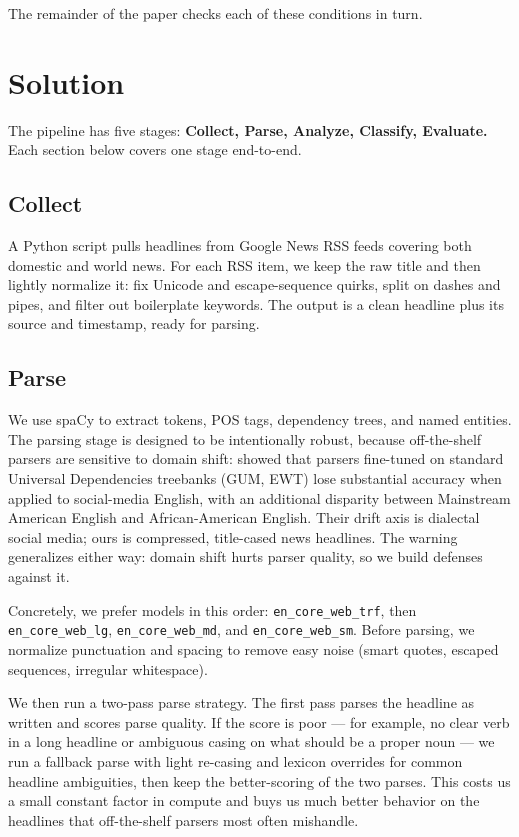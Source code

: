 \documentclass[11pt]{article}
\begin{document}
The remainder of the paper checks each of these conditions in turn.

\section{Solution}
The pipeline has five stages: \textbf{Collect, Parse, Analyze, Classify, Evaluate.} Each section below covers one stage end-to-end.

\subsection{Collect}
A Python script pulls headlines from Google News RSS feeds covering both domestic and world news. For each RSS item, we keep the raw title and then lightly normalize it: fix Unicode and escape-sequence quirks, split on dashes and pipes, and filter out boilerplate keywords. The output is a clean headline plus its source and timestamp, ready for parsing.

\subsection{Parse}
We use spaCy to extract tokens, POS tags, dependency trees, and named entities. The parsing stage is designed to be intentionally robust, because off-the-shelf parsers are sensitive to domain shift: \citet{eggleston-oconnor-2022-cross} showed that parsers fine-tuned on standard Universal Dependencies treebanks (GUM, EWT) lose substantial accuracy when applied to social-media English, with an additional disparity between Mainstream American English and African-American English. Their drift axis is dialectal social media; ours is compressed, title-cased news headlines. The warning generalizes either way: domain shift hurts parser quality, so we build defenses against it.

Concretely, we prefer models in this order: \texttt{en\_core\_web\_trf}, then \texttt{en\_core\_web\_lg}, \texttt{en\_core\_web\_md}, and \texttt{en\_core\_web\_sm}. Before parsing, we normalize punctuation and spacing to remove easy noise (smart quotes, escaped sequences, irregular whitespace).

We then run a two-pass parse strategy. The first pass parses the headline as written and scores parse quality. If the score is poor --- for example, no clear verb in a long headline or ambiguous casing on what should be a proper noun --- we run a fallback parse with light re-casing and lexicon overrides for common headline ambiguities, then keep the better-scoring of the two parses. This costs us a small constant factor in compute and buys us much better behavior on the headlines that off-the-shelf parsers most often mishandle.
\end{document}
